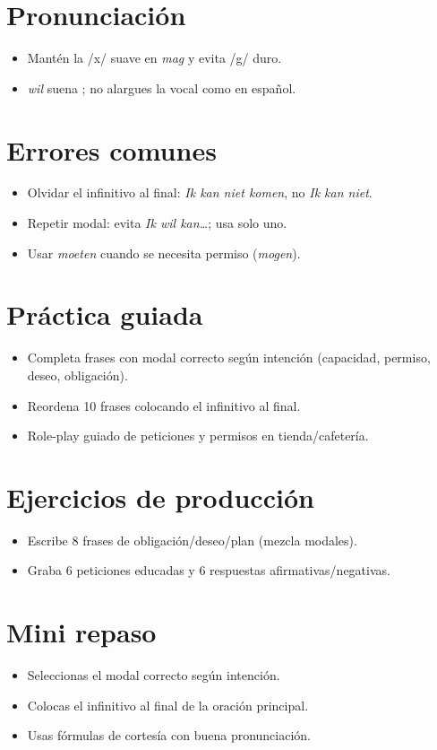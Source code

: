 \section{Pronunciación}
\begin{itemize}[leftmargin=*]
	\item Mantén la /x/ suave en \textit{mag} y evita /g/ duro.
	\item \textit{wil} suena ; no alargues la vocal como en español.
\end{itemize}

\section{Errores comunes}
\begin{itemize}[leftmargin=*]
	\item Olvidar el infinitivo al final: \textit{Ik kan niet komen}, no \textit{Ik kan niet}.
	\item Repetir modal: evita \textit{Ik wil kan\ldots{}}; usa solo uno.
	\item Usar \textit{moeten} cuando se necesita permiso (\textit{mogen}).
\end{itemize}

\section{Práctica guiada}
\begin{itemize}[leftmargin=*]
	\item Completa frases con modal correcto según intención (capacidad, permiso, deseo, obligación).
	\item Reordena 10 frases colocando el infinitivo al final.
	\item Role-play guiado de peticiones y permisos en tienda/cafetería.
\end{itemize}

\section{Ejercicios de producción}
\begin{itemize}[leftmargin=*]
	\item Escribe 8 frases de obligación/deseo/plan (mezcla modales).
	\item Graba 6 peticiones educadas y 6 respuestas afirmativas/negativas.
\end{itemize}

\section{Mini repaso}
\begin{itemize}[leftmargin=*]
	\item Seleccionas el modal correcto según intención.
	\item Colocas el infinitivo al final de la oración principal.
	\item Usas fórmulas de cortesía con buena pronunciación.
\end{itemize}

